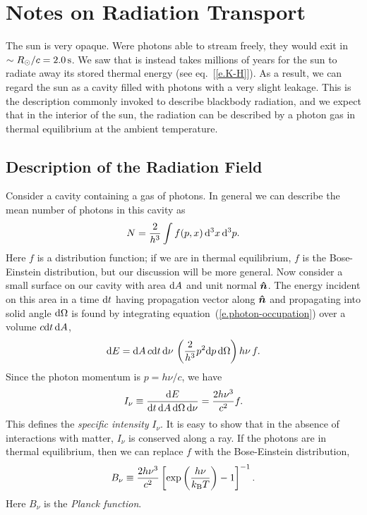 \chapter{Notes on Radiation Transport}

\newcommand{\unitvector}[1]{\ensuremath{\bvec{\hat{#1}}}}
\newcommand{\unitn}{\unitvector{n}}
\newcommand{\unitk}{\unitvector{k}}
\newcommand{\Ledd}{\ensuremath{L_{\mathrm{Edd}}}}
\newcommand{\Prad}{\ensuremath{P_{\mathrm{rad}}}}
\newcommand{\Pgas}{\ensuremath{P_{\mathrm{gas}}}}


The sun is very opaque.  Were photons able to stream freely, they would exit in $\sim R_{\odot}/c = 2.0\,\mathrm{s}$.  We saw that is instead takes millions of years for the sun to radiate away its stored thermal energy (see eq.~[\ref{e.K-H}]).  As a result, we can regard the sun as a cavity filled with photons with a very slight leakage.  This is the description commonly invoked to describe blackbody radiation, and we expect that in the interior of the sun, the radiation can be described by a photon gas in thermal equilibrium at the ambient temperature.

\section{Description of the Radiation Field}

Consider a cavity containing a gas of photons. In general we can describe the mean number of photons in this cavity as
\begin{equation}\label{e.photon-occupation}
 N = \frac{2}{h^{3}}\int f(p,x)\,\mathrm{d}^{3}x\,\mathrm{d}^{3}p.
\end{equation}
Here $f$ is a distribution function; if we are in thermal equilibrium, $f$ is the Bose-Einstein distribution, but our discussion will be more general.  Now consider a small surface on our cavity with area $\mathrm{d} A$ and unit normal $\unitn$.  The energy incident on this area in a time $\mathrm{d} t$ having propagation vector along $\unitn$ and propagating into solid angle $\mathrm{d}\Omega$ is found by integrating equation~(\ref{e.photon-occupation}) over a volume $c\mathrm{d} t\,\mathrm{d} A$,
\[
\mathrm{d} E = \mathrm{d} A\,c\mathrm{d} t\,\mathrm{d}\nu\,\left( \frac{2}{h^{3}}p^{2}\mathrm{d} p\,\mathrm{d}\Omega\right)  h\nu \, f.
\]
Since the photon momentum is $p = h\nu/c$, we have
\begin{equation}\label{e.specific-intensity}
I_{\nu} \equiv \frac{\mathrm{d} E}{\mathrm{d} t\,\mathrm{d} A\,\mathrm{d}\Omega\,\mathrm{d}\nu} = \frac{2h\nu^{3}}{c^{2}} f.
\end{equation}
This defines the \emph{specific intensity} $I_{\nu}$.  It is easy to show that in the absence of interactions with matter, $I_{\nu}$ is conserved along a ray.  If the photons are in thermal equilibrium, then we can replace $f$ with the Bose-Einstein distribution,
\begin{equation}\label{e.Bnu}
B_{\nu} \equiv \frac{2 h\nu^{3}}{c^{2}} \left[\exp\left(\frac{h\nu}{k_\mathrm{B} T}\right)-1\right]^{-1}.
\end{equation}
Here $B_{\nu}$ is the \emph{Planck function}.

